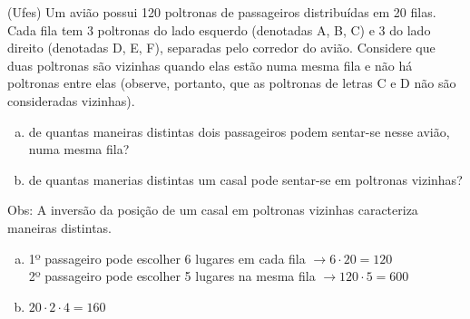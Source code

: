 \begin{ex}
 (Ufes) Um avião possui 120 poltronas de passageiros distribuídas em 20 filas. Cada fila tem 3 poltronas do lado esquerdo (denotadas A, B, C) e 3 do lado direito (denotadas D, E, F), separadas pelo corredor do avião. Considere que duas poltronas são vizinhas quando elas estão numa mesma fila e não há poltronas entre elas (observe, portanto, que as poltronas de letras C e D não são consideradas vizinhas).
  \begin{center}
  \end{center}


    \begin{enumerate}[(a)]
    \item de quantas maneiras distintas dois passageiros podem sentar-se nesse avião, numa mesma fila?
    \item de quantas manerias distintas um casal pode sentar-se em poltronas vizinhas?
    \end{enumerate}
Obs: A inversão da posição de um casal em poltronas vizinhas caracteriza maneiras distintas.
    \begin{sol}
      \phantom{A}
        \begin{enumerate} [(a)]
            \item 1º passageiro pode escolher 6 lugares em cada fila  $\rightarrow6\cdot20=120$\\ 2º passageiro pode escolher 5 lugares na mesma fila  $\rightarrow120\cdot5=600$
            \item $20\cdot2\cdot4=160$
            
        \end{enumerate}
    \end{sol}
\end{ex}
